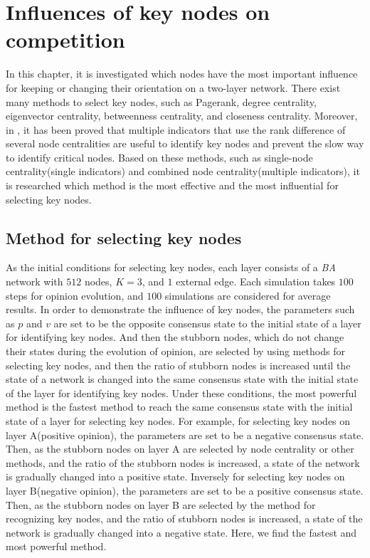 
\chapter{Influences of key nodes on competition}
\label{chap5}
In this chapter, it is investigated which nodes have the most important influence for keeping or changing their orientation on a two-layer network. There exist many methods to select key nodes, such as Pagerank, degree centrality, eigenvector centrality, betweenness centrality, and closeness centrality. Moreover, in \parencite{mesgari2015, huang2014}, it has been proved that multiple indicators that use the rank difference of several node centralities are useful to identify key nodes and prevent the slow way to identify critical nodes. Based on these methods, such as single-node centrality(single indicators) and combined node centrality(multiple indicators), it is researched which method is the most effective and the most influential for selecting key nodes.  

\section{Method for selecting key nodes}
\label{sec:method for finding key nodes}
As the initial conditions for selecting key nodes, each layer consists of a \textit{BA} network with $512$ nodes, $K=3$, and $1$ external edge. Each simulation takes $100$ steps for opinion evolution, and $100$ simulations are considered for average results. In order to demonstrate the influence of key nodes, the parameters such as $p$ and $v$ are set to be the opposite consensus state to the initial state of a layer for identifying key nodes. And then the stubborn nodes, which do not change their states during the evolution of opinion, are selected by using methods for selecting key nodes, and then the ratio of stubborn nodes is increased until the state of a network is changed into the same consensus state with the initial state of the layer for identifying key nodes. Under these conditions, the most powerful method is the fastest method to reach the same consensus state with the initial state of a layer for selecting key nodes. For example, for selecting key nodes on layer A(positive opinion), the parameters are set to be a negative consensus state. Then, as the stubborn nodes on layer A are selected by node centrality or other methods, and the ratio of the stubborn nodes is increased, a state of the network is gradually changed into a positive state. Inversely for selecting key nodes on layer B(negative opinion), the parameters are set to be a positive consensus state. Then, as the stubborn nodes on layer B are selected by the method for recognizing key nodes, and the ratio of stubborn nodes is increased, a state of the network is gradually changed into a negative state. Here, we find the fastest and most powerful method.

